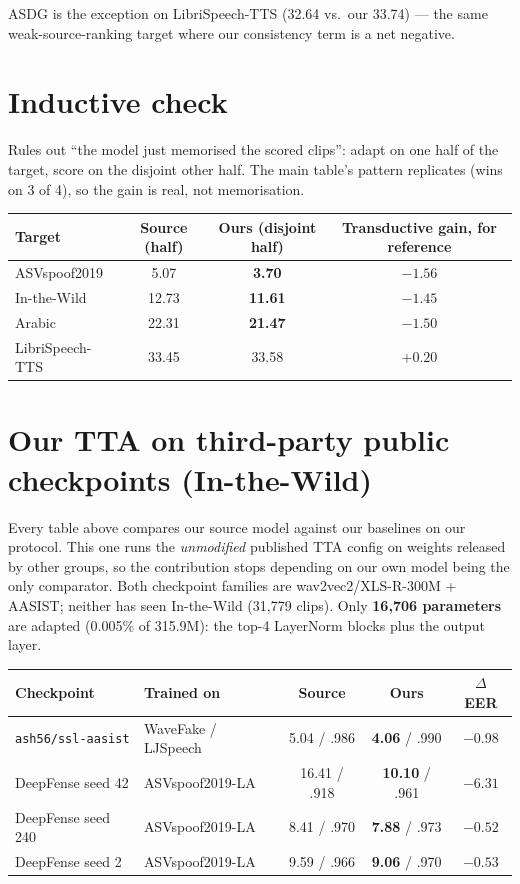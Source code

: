 \documentclass[11pt]{article}
\begin{document}
ASDG is the exception on LibriSpeech-TTS (32.64 vs.\ our 33.74) --- the same
weak-source-ranking target where our consistency term is a net negative.

\section*{Inductive check}
Rules out ``the model just memorised the scored clips'': adapt on one half of
the target, score on the disjoint other half. The main table's pattern
replicates (wins on 3 of 4), so the gain is real, not memorisation.
\begin{table}[h]
\centering
\begin{tabular}{@{}lccc@{}}
\toprule
Target & Source (half) & Ours (disjoint half) & Transductive gain, for reference \\
\midrule
ASVspoof2019 & 5.07 & \textbf{3.70} & $-1.56$ \\
In-the-Wild & 12.73 & \textbf{11.61} & $-1.45$ \\
Arabic & 22.31 & \textbf{21.47} & $-1.50$ \\
LibriSpeech-TTS & 33.45 & 33.58 & $+0.20$ \\
\bottomrule
\end{tabular}
\end{table}

\newpage
\section*{Our TTA on third-party public checkpoints (In-the-Wild)}
Every table above compares our source model against our baselines on our
protocol. This one runs the \emph{unmodified} published TTA config on weights
released by other groups, so the contribution stops depending on our own model
being the only comparator. Both checkpoint families are wav2vec2/XLS-R-300M +
AASIST; neither has seen In-the-Wild (31{,}779 clips). Only \textbf{16{,}706
parameters} are adapted (0.005\% of 315.9M): the top-4 LayerNorm blocks plus
the output layer.
\begin{table}[h]
\centering
\begin{tabular}{@{}llccc@{}}
\toprule
Checkpoint & Trained on & Source & Ours & $\Delta$ EER \\
\midrule
\texttt{ash56/ssl-aasist} & WaveFake / LJSpeech & 5.04 / .986 & \textbf{4.06} / .990 & $-0.98$ \\
DeepFense seed 42 & ASVspoof2019-LA & 16.41 / .918 & \textbf{10.10} / .961 & \cellcolor{green!12}$-6.31$ \\
DeepFense seed 240 & ASVspoof2019-LA & 8.41 / .970 & \textbf{7.88} / .973 & $-0.52$ \\
DeepFense seed 2 & ASVspoof2019-LA & 9.59 / .966 & \textbf{9.06} / .970 & $-0.53$ \\
\bottomrule
\end{tabular}
\end{table}
\end{document}

